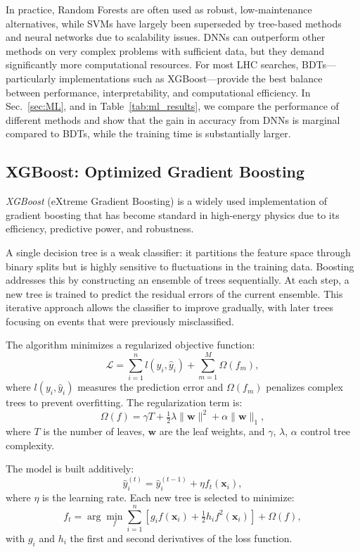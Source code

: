 In practice, Random Forests are often used as robust, low-maintenance alternatives, while SVMs have largely been superseded by tree-based methods and neural networks due to scalability issues. DNNs can outperform other methods on very complex problems with sufficient data, but they demand significantly more computational resources. For most LHC searches, BDTs—particularly implementations such as XGBoost—provide the best balance between performance, interpretability, and computational efficiency. In Sec.~\ref{sec:ML}, and in Table~\ref{tab:ml_results}, we compare the performance of different methods and show that the gain in accuracy from DNNs is marginal compared to BDTs, while the training time is substantially larger.


\subsection{XGBoost: Optimized Gradient Boosting}
\label{ssec:xgboost}

\textit{XGBoost} (eXtreme Gradient Boosting) is a widely used implementation of gradient boosting that has become standard in high-energy physics due to its efficiency, predictive power, and robustness. 

A single decision tree is a weak classifier: it partitions the feature space through binary splits but is highly sensitive to fluctuations in the training data. Boosting addresses this by constructing an ensemble of trees sequentially. At each step, a new tree is trained to predict the residual errors of the current ensemble. This iterative approach allows the classifier to improve gradually, with later trees focusing on events that were previously misclassified.

The algorithm minimizes a regularized objective function:
\begin{equation}
\mathcal{L} = \sum_{i=1}^{n} l(y_i, \hat{y}_i) + \sum_{m=1}^{M} \Omega(f_m),
\end{equation}
where $l(y_i, \hat{y}_i)$ measures the prediction error and $\Omega(f_m)$ penalizes complex trees to prevent overfitting. The regularization term is:
\begin{equation}
\Omega(f) = \gamma T + \tfrac{1}{2}\lambda \|\mathbf{w}\|^2 + \alpha \|\mathbf{w}\|_1,
\end{equation}
where $T$ is the number of leaves, $\mathbf{w}$ are the leaf weights, and $\gamma$, $\lambda$, $\alpha$ control tree complexity.

The model is built additively:
\begin{equation}
\hat{y}_i^{(t)} = \hat{y}_i^{(t-1)} + \eta f_t(\mathbf{x}_i),
\end{equation}
where $\eta$ is the learning rate. Each new tree is selected to minimize:
\begin{equation}
f_t = \arg\min_{f} \sum_{i=1}^{n} \left[g_i f(\mathbf{x}_i) + \tfrac{1}{2} h_i f^2(\mathbf{x}_i)\right] + \Omega(f),
\end{equation}
with $g_i$ and $h_i$ the first and second derivatives of the loss function.

